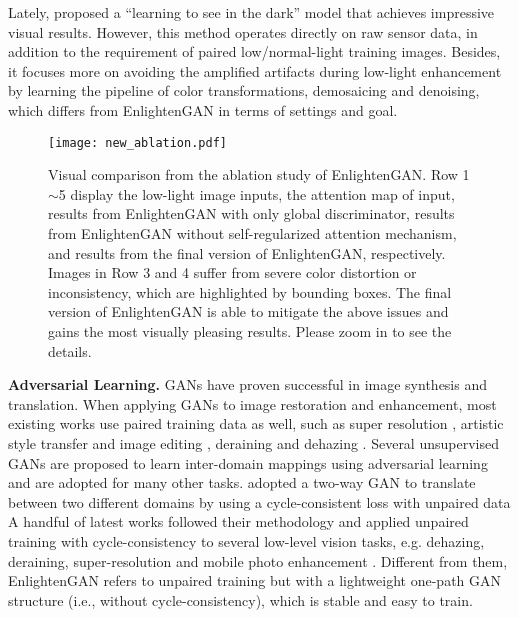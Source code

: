 \documentclass[journal]{IEEEtran}
\begin{document}
Lately, \cite{chen2018learning} proposed a ``learning to see in the dark'' model that achieves impressive visual results. However, this method operates directly on
raw sensor data, in addition to the requirement of paired low/normal-light training images. Besides, it focuses more on avoiding the amplified artifacts during low-light enhancement by learning the pipeline of color transformations, demosaicing and denoising, which differs from EnlightenGAN in terms of settings and goal. 


\begin{figure*}[!t]
\centering
\texttt{[image: new\_ablation.pdf]}
\caption{Visual comparison from the ablation study of EnlightenGAN. Row 1$\sim$5 display the low-light image inputs, the attention map of input, results from EnlightenGAN with only global discriminator, results from EnlightenGAN without self-regularized attention mechanism, and results from the final version of EnlightenGAN, respectively. Images in Row 3 and 4 suffer from severe color distortion or inconsistency, which are highlighted by bounding boxes. The final version of EnlightenGAN is able to mitigate the above issues and gains the most visually pleasing results. Please zoom in to see the details.}
\label{fig:ablation}
\end{figure*}
















\noindent \textbf{Adversarial Learning.}  
GANs \cite{goodfellow2014generative,gong2019autogan} have proven successful in image synthesis and translation. 
When applying GANs to image restoration and enhancement, most existing works use paired training data as well, such as super resolution \cite{ledig2017photo}, artistic style transfer and image editing \cite{yang2019controllable,yang2020deep}, deraining \cite{qian2018attentive} and dehazing \cite{li2018single}. Several unsupervised GANs are proposed to learn inter-domain mappings using adversarial learning and are adopted for many other tasks. \cite{zhu2017unpaired,liu2017unsupervised} adopted a two-way GAN to translate between two different domains by using a cycle-consistent loss with unpaired data
A handful of latest works followed their methodology and applied unpaired training with cycle-consistency to several low-level vision tasks, e.g. dehazing, deraining, super-resolution and mobile photo enhancement  \cite{yang2018towards,yuan122018unsupervised,chen2018deep,jin2018unsupervised}. Different from them, EnlightenGAN refers to unpaired training but with a lightweight one-path GAN structure (i.e., without cycle-consistency), which is stable and easy to train.
\end{document}
